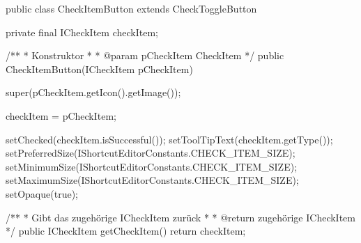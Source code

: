 \begin{spacing}{0.75}
\begin{javacode}[firstnumber=12]
public class CheckItemButton extends CheckToggleButton
{
  private final ICheckItem checkItem;
  
  /**
  * Konstruktor
  *
  * @param pCheckItem CheckItem
  */
  public CheckItemButton(ICheckItem pCheckItem)
  {
    super(pCheckItem.getIcon().getImage());
    
    checkItem = pCheckItem;
    
    setChecked(checkItem.isSuccessful());
    setToolTipText(checkItem.getType());
    setPreferredSize(IShortcutEditorConstants.CHECK_ITEM_SIZE);
    setMinimumSize(IShortcutEditorConstants.CHECK_ITEM_SIZE);
    setMaximumSize(IShortcutEditorConstants.CHECK_ITEM_SIZE);
    setOpaque(true);
  }
  
  /**
  * Gibt das zugehörige ICheckItem zurück
  *
  * @return zugehörige ICheckItem
  */
  public ICheckItem getCheckItem()
  {
    return checkItem;
  }
}

\end{javacode}
\end{spacing}